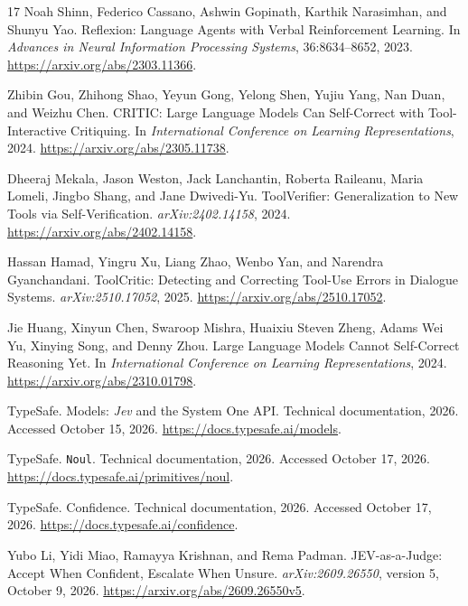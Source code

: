 \documentclass[10pt,twocolumn,letterpaper]{article}
\begin{document}
\begin{thebibliography}{17}
Noah Shinn, Federico Cassano, Ashwin Gopinath, Karthik Narasimhan, and Shunyu Yao.
\newblock Reflexion: Language Agents with Verbal Reinforcement Learning.
\newblock In \emph{Advances in Neural Information Processing Systems}, 36:8634--8652, 2023.
\newblock \url{https://arxiv.org/abs/2303.11366}.

Zhibin Gou, Zhihong Shao, Yeyun Gong, Yelong Shen, Yujiu Yang, Nan Duan, and Weizhu Chen.
\newblock CRITIC: Large Language Models Can Self-Correct with Tool-Interactive Critiquing.
\newblock In \emph{International Conference on Learning Representations}, 2024.
\newblock \url{https://arxiv.org/abs/2305.11738}.

Dheeraj Mekala, Jason Weston, Jack Lanchantin, Roberta Raileanu, Maria Lomeli, Jingbo Shang, and Jane Dwivedi-Yu.
\newblock ToolVerifier: Generalization to New Tools via Self-Verification.
\newblock \emph{arXiv:2402.14158}, 2024.
\newblock \url{https://arxiv.org/abs/2402.14158}.

Hassan Hamad, Yingru Xu, Liang Zhao, Wenbo Yan, and Narendra Gyanchandani.
\newblock ToolCritic: Detecting and Correcting Tool-Use Errors in Dialogue Systems.
\newblock \emph{arXiv:2510.17052}, 2025.
\newblock \url{https://arxiv.org/abs/2510.17052}.

Jie Huang, Xinyun Chen, Swaroop Mishra, Huaixiu Steven Zheng, Adams Wei Yu, Xinying Song, and Denny Zhou.
\newblock Large Language Models Cannot Self-Correct Reasoning Yet.
\newblock In \emph{International Conference on Learning Representations}, 2024.
\newblock \url{https://arxiv.org/abs/2310.01798}.

TypeSafe.
\newblock Models: \textit{Jev} and the System One API.
\newblock Technical documentation, 2026. Accessed October 15, 2026.
\newblock \url{https://docs.typesafe.ai/models}.

TypeSafe.
\newblock \texttt{Noul}.
\newblock Technical documentation, 2026. Accessed October 17, 2026.
\newblock \url{https://docs.typesafe.ai/primitives/noul}.

TypeSafe.
\newblock Confidence.
\newblock Technical documentation, 2026. Accessed October 17, 2026.
\newblock \url{https://docs.typesafe.ai/confidence}.

Yubo Li, Yidi Miao, Ramayya Krishnan, and Rema Padman.
\newblock JEV-as-a-Judge: Accept When Confident, Escalate When Unsure.
\newblock \emph{arXiv:2609.26550}, version 5, October 9, 2026.
\newblock \url{https://arxiv.org/abs/2609.26550v5}.


\end{thebibliography}
\end{document}
